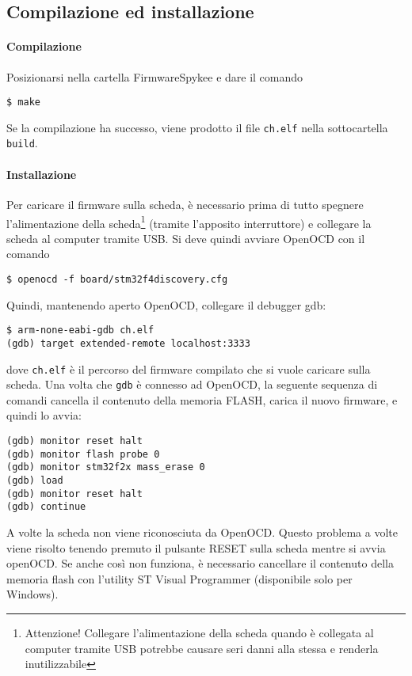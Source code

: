 \subsection*{Compilazione ed installazione}

\paragraph{Compilazione} Posizionarsi nella cartella FirmwareSpykee e dare il comando
\begin{verbatim}
$ make
\end{verbatim}
Se la compilazione ha successo, viene prodotto il file \verb|ch.elf| nella sottocartella \verb|build|.

\paragraph{Installazione} Per caricare il firmware sulla scheda, è necessario prima di tutto spegnere l'alimentazione della scheda\footnote{Attenzione! Collegare l'alimentazione della scheda quando è collegata al computer tramite USB potrebbe causare seri danni alla stessa e renderla inutilizzabile} (tramite l'apposito interruttore) e collegare la scheda al computer tramite USB. Si deve quindi avviare OpenOCD con il comando
\begin{verbatim}
$ openocd -f board/stm32f4discovery.cfg
\end{verbatim}
Quindi, mantenendo aperto OpenOCD, collegare il debugger gdb:
\begin{verbatim}
$ arm-none-eabi-gdb ch.elf
(gdb) target extended-remote localhost:3333
\end{verbatim}
dove \verb|ch.elf| è il percorso del firmware compilato che si vuole caricare sulla scheda. Una volta che \verb|gdb| è connesso ad OpenOCD, la seguente sequenza di comandi cancella il contenuto della memoria FLASH, carica il nuovo firmware, e quindi lo avvia:
\begin{verbatim}
(gdb) monitor reset halt
(gdb) monitor flash probe 0 
(gdb) monitor stm32f2x mass_erase 0 
(gdb) load 
(gdb) monitor reset halt 
(gdb) continue
\end{verbatim}

\begin{nota} A volte la scheda non viene riconosciuta da OpenOCD. Questo problema a volte viene risolto tenendo premuto il pulsante RESET sulla scheda mentre si avvia openOCD. Se anche così non funziona, è necessario cancellare il contenuto della memoria flash con l'utility ST Visual Programmer (disponibile solo per Windows).
\end{nota}

